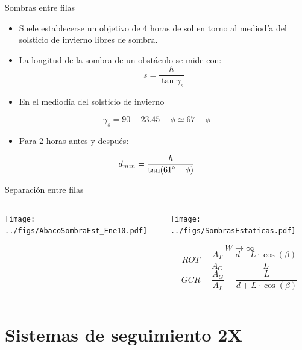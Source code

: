 \documentclass[aspectratio=169, usenames,svgnames,dvipsnames]{beamer}
\begin{document}
\begin{frame}[label={sec:org60e311d}]{Sombras entre filas}
\begin{itemize}
\item Suele establecerse un objetivo de \alert{4 horas de sol en torno al mediodía del solsticio de invierno libres de sombra}.

\item La longitud de la sombra de un obstáculo se mide con:$$s=\frac{h}{\tan\gamma_{s}}$$

\item En el mediodía del solsticio de invierno
\end{itemize}
$$\gamma_{s}=90-23.45-\phi\simeq67-\phi$$ 

\begin{itemize}
\item Para 2 horas antes y después:
\end{itemize}
$$d_{min}=\frac{h}{\tan(61\degree-\phi)}$$
\end{frame}
\begin{frame}[label={sec:org5c2f544}]{Separación entre filas}
\begin{columns}
\begin{column}{0.5\columnwidth}
\begin{center}
\texttt{[image: ../figs/AbacoSombraEst\_Ene10.pdf]}
\end{center}
\end{column}



\begin{column}{0.5\columnwidth}
\begin{center}
\texttt{[image: ../figs/SombrasEstaticas.pdf]}
\end{center}
\[
W \to \infty\]
\[
  ROT=\frac{A_T}{A_G}=\frac{d+L \cdot \cos(\beta)}{L}
\]
\[
  GCR=\frac{A_G}{A_L}=\frac{L}{d+L \cdot \cos(\beta)}
\]
\end{column}
\end{columns}
\end{frame}


\section{Sistemas de seguimiento 2X}
\label{sec:orgc2f561a}
\end{document}
